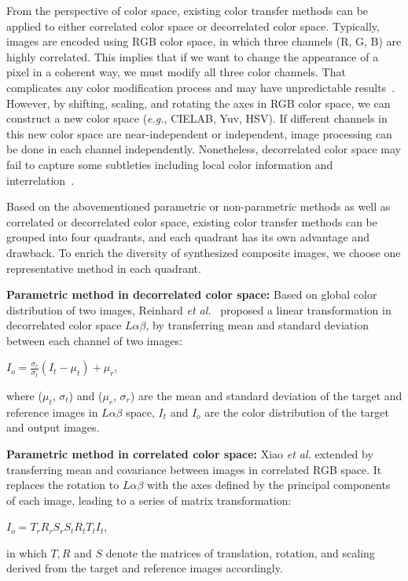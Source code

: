 \documentclass[10pt,twocolumn,letterpaper]{article}
\begin{document}
From the perspective of color space, existing color transfer methods can be applied to either correlated color space or decorrelated color space. Typically, images are encoded using RGB color space, in which three channels (R, G, B) are highly correlated. This implies that if we want to change the appearance of a pixel in a coherent way, we must modify all three color channels. That complicates any color modification process and may have unpredictable results~\cite{reinhard2001colorsupp}. However, by shifting, scaling, and rotating the axes in RGB color space, we can construct a new color space (\emph{e.g.}, CIELAB, Yuv, HSV). If different channels in this new color space are near-independent or independent, image processing can be done in each channel independently. Nonetheless, decorrelated color space may fail to capture some subtleties including local color information and interrelation~\cite{xiao2006colorsupp}.

Based on the abovementioned parametric or non-parametric methods as well as correlated or decorrelated color space, existing color transfer methods can be grouped into four quadrants, and each quadrant has its own advantage and drawback. To enrich the diversity of synthesized composite images, we choose one representative method in each quadrant.


\textbf{Parametric method in decorrelated color space: }
Based on global color distribution of two images, Reinhard \textit{et al.}~\cite{reinhard2001colorsupp} proposed a linear transformation in decorrelated color space $L\alpha\beta$, by transferring mean and standard deviation between each channel of two images:
\begin{center}
$I_o=\frac{\sigma_r}{\sigma_t}(I_t-\mu_t)+\mu_r$,
\end{center}
\iffalse Here, the subscripts $t$,$r$ and $o$ correspond to the target, reference and output image, and $\mu$ and $\sigma$ denote mean and standard deviation. After this process, the transferred target image is rotated back to RGB color space to apply the reference statistics. \fi
where ($\mu_t$, $\sigma_t$) and ($\mu_r$, $\sigma_r$) are the mean and standard deviation of the target and reference images in $L\alpha\beta$ space, $I_t$ and $I_o$ are the color distribution of the target and output images.

\textbf{Parametric method in correlated color space: }
Xiao \textit{et al.} \cite{xiao2006colorsupp} extended \cite{reinhard2001colorsupp} by transferring mean and covariance between images in correlated RGB space. It replaces the rotation to $L\alpha\beta$ with the axes defined by the principal components of each image, leading to a series of matrix transformation:
\begin{center}
$I_o=T_rR_rS_rS_tR_tT_tI_t$,
\end{center}
in which $T,R$ and $S$ denote the matrices of translation, rotation, and scaling derived from the target and reference images accordingly.
\end{document}
